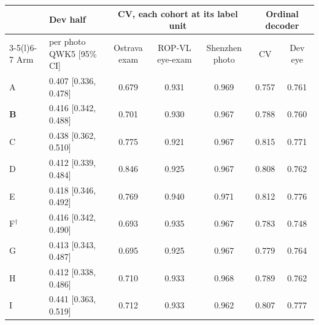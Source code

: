 \begin{tabular}{@{}ll@{\hspace{6pt}}ccc@{\hspace{6pt}}cc@{}}
\toprule
 & Dev half & \multicolumn{3}{c}{CV, each cohort at its label unit} & \multicolumn{2}{c}{Ordinal decoder}\\
\cmidrule(lr){3-5}\cmidrule(l){6-7}
Arm & per photo QWK5 [95\% CI] & Ostrava exam & ROP-VL eye-exam & Shenzhen photo & CV & Dev eye\\
\midrule
A & 0.407 [0.336, 0.478] & 0.679 & 0.931 & 0.969 & 0.757 & 0.761 \\
\textbf{B} & 0.416 [0.342, 0.488] & 0.701 & 0.930 & 0.967 & 0.788 & 0.760 \\
C & 0.438 [0.362, 0.510] & 0.775 & 0.921 & 0.967 & 0.815 & 0.771 \\
D & 0.412 [0.339, 0.484] & 0.846 & 0.925 & 0.967 & 0.808 & 0.762 \\
E & 0.418 [0.346, 0.492] & 0.769 & 0.940 & 0.971 & 0.812 & 0.776 \\
F$^\dagger$ & 0.416 [0.342, 0.490] & 0.693 & 0.935 & 0.967 & 0.783 & 0.748 \\
G & 0.413 [0.343, 0.487] & 0.695 & 0.925 & 0.967 & 0.779 & 0.764 \\
H & 0.412 [0.338, 0.486] & 0.710 & 0.933 & 0.968 & 0.789 & 0.762 \\
I & 0.441 [0.363, 0.519] & 0.712 & 0.933 & 0.962 & 0.807 & 0.777 \\
\bottomrule
\end{tabular}
